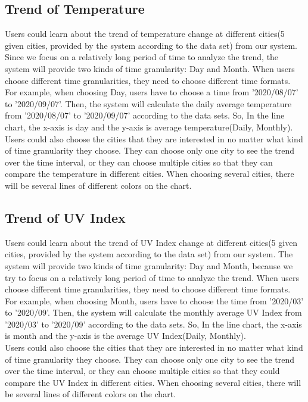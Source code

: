\documentclass[]{article}
\begin{document}
	\subsection{Trend of Temperature}
	
	Users could learn about the trend of temperature change at different cities(5 given cities, provided by the system according to the data set) from our system. Since we focus on a relatively long period of time to analyze the trend, the system will provide two kinds of time granularity: Day and Month. When users choose different time granularities, they need to choose different time formats. For example, when choosing Day, users have to choose a time from '2020/08/07' to '2020/09/07'. Then, the system will calculate the daily average temperature from '2020/08/07' to '2020/09/07' according to the data sets. So, In the line chart, the x-axis is day and the y-axis is average temperature(Daily, Monthly).    \\
	
	\noindent Users could also choose the cities that they are interested in no matter what kind of time granularity they choose. They can choose only one city to see the trend over the time interval, or they can choose multiple cities so that they can compare the temperature in different cities. When choosing several cities, there will be several lines of different colors on the chart. 
	
	\subsection{Trend of UV Index}
	
	Users could learn about the trend of UV Index change at different cities(5 given cities, provided by the system according to the data set) from our system. The system will provide two kinds of time granularity: Day and Month, because we try to focus on a relatively long period of time to analyze the trend. When users choose different time granularities, they need to choose different time formats. For example, when choosing Month, users have to choose the time from '2020/03' to '2020/09'. Then, the system will calculate the monthly average UV Index from '2020/03' to '2020/09' according to the data sets. So, In the line chart, the x-axis is month and the y-axis is the average UV Index(Daily, Monthly).     \\
	
	\noindent Users could also choose the cities that they are interested in no matter what kind of time granularity they choose. They can choose only one city to see the trend over the time interval, or they can choose multiple cities so that they could compare the UV Index in different cities. When choosing several cities, there will be several lines of different colors on the chart. \\
	
\end{document}
